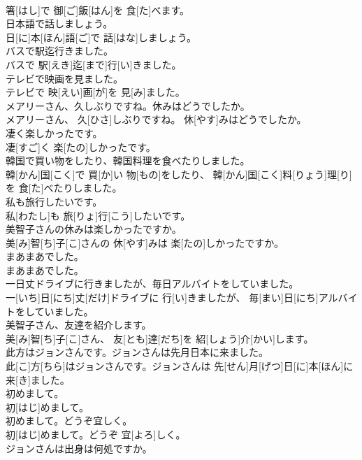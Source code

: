 \documentclass[8pt]{extreport}
\begin{document}
\begin{CJK}{UTF8}{min}
\\	箸[はし]で 御[ご]飯[はん]を 食[た]べます。
\\	日本語で話しましょう。	
\\	日[に]本[ほん]語[ご]で 話[はな]しましょう。
\\	バスで駅迄行きました。	
\\	バスで 駅[えき]迄[まで]行[い]きました。
\\	テレビで映画を見ました。	
\\	テレビで 映[えい]画[が]を 見[み]ました。
\\	メアリーさん、久しぶりですね。休みはどうでしたか。	
\\	メアリーさん、 久[ひさ]しぶりですね。 休[やす]みはどうでしたか。
\\	凄く楽しかったです。	
\\	凄[すご]く 楽[たの]しかったです。
\\	韓国で買い物をしたり、韓国料理を食べたりしました。	
\\	韓[かん]国[こく]で 買[か]い 物[もの]をしたり、 韓[かん]国[こく]料[りょう]理[り]を 食[た]べたりしました。
\\	私も旅行したいです。	
\\	私[わたし]も 旅[りょ]行[こう]したいです。
\\	美智子さんの休みは楽しかったですか。	
\\	美[み]智[ち]子[こ]さんの 休[やす]みは 楽[たの]しかったですか。
\\	まあまあでした。	
\\	まあまあでした。
\\	一日丈ドライブに行きましたが、毎日アルバイトをしていました。	
\\	一[いち]日[にち]丈[だけ]ドライブに 行[い]きましたが、 毎[まい]日[にち]アルバイトをしていました。
\\	美智子さん、友達を紹介します。	
\\	美[み]智[ち]子[こ]さん、 友[とも]達[だち]を 紹[しょう]介[かい]します。
\\	此方はジョンさんです。ジョンさんは先月日本に来ました。	
\\	此[こ]方[ちら]はジョンさんです。ジョンさんは 先[せん]月[げつ]日[に]本[ほん]に 来[き]ました。
\\	初めまして。	
\\	初[はじ]めまして。
\\	初めまして。どうぞ宜しく。	
\\	初[はじ]めまして。どうぞ 宜[よろ]しく。
\\	ジョンさんは出身は何処ですか。	

\end{CJK}
\end{document}
